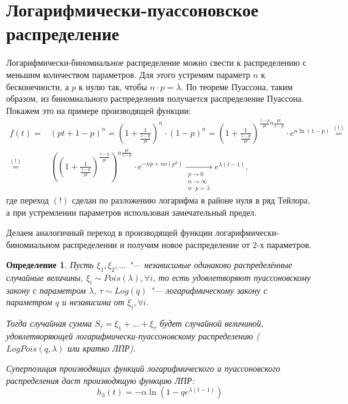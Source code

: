 \documentclass[12pt, specialist, subf, substylefile = spbu_report.rtx]{disser}
\newtheorem{define}{Определение}
\begin{document}
	\section{Логарифмически-пуассоновское распределение}
	
	Логарифмически-биномиальное распределение можно свести к распределению с меньшим количеством параметров. Для этого устремим параметр $n$ к бесконечности, а $p$ к нулю так, чтобы $n \cdot p = \lambda$. По теореме Пуассона, таким образом, из биномиального распределения получается распределение Пуассона. Покажем это на примере производящей функции: 
	\[
		\begin{aligned}
			f (t) =& (p t + 1 - p) ^n = \left(1 + \frac {1}{\frac{1 - p} {pt}}\right) ^n \cdot (1 - p) ^n = \left(1 + \frac {1}{\frac{1 - p} {pt}}\right) ^{\frac{1 - p} {pt} n \frac {pt} {1 - p}} \cdot e ^{n \ln(1 - p)} \stackrel{(!)}{=}\\
			\stackrel{(!)}{=}& \left(\left(1 + \frac {1}{\frac{1 - p} {pt}}\right) ^{\frac{1 - p} {pt}}\right) ^ {n \frac {pt} {1 - p}} \cdot e ^{-np + no(p ^2)} \xrightarrow[\substack{p \to 0\\n \to \infty\\n \cdot p = \lambda}]{} e ^{\lambda (t - 1)},
		\end{aligned}
	\]
	где переход $(!)$ сделан по разложению логарифма в районе нуля в ряд Тейлора, а при устремлении параметров использован замечательный предел.
	
	Делаем аналогичный переход в производящей функции логарифмически-биномиальном распределении и получим новое распределение от $2$-х параметров.
	
	\begin{define}
		Пусть $\xi _1, \xi _2, \dots$ "--- независимые одинаково распределённые случайные величины, $\xi _i \sim Pois(\lambda), \forall i$, то есть удовлетворяют пуассоновскому закону с параметром $\lambda$, $\tau \sim Log(q)$ "--- логарифмическому закону с параметром $q$ и независима от $\xi _i, \forall i$.
		
		Тогда случайная сумма $S _\tau = \xi _1 + \dots + \xi _\tau$ будет случайной величиной, удовлетворяющей логарифмически-пуассоновскому распределению ($LogPois(q, \lambda)$ или кратко \glqq ЛПР\grqq).
		
		Суперпозиция производящих функций логарифмического и пуассоновского распределения даст производящую функцию ЛПР:
		\begin{equation}\label{eq:LPR}
			h _3 (t) = -\alpha \ln (1 - q e ^{\lambda (t - 1)})
		\end{equation}
		\label{def:LPR}
	\end{define}
\end{document}

